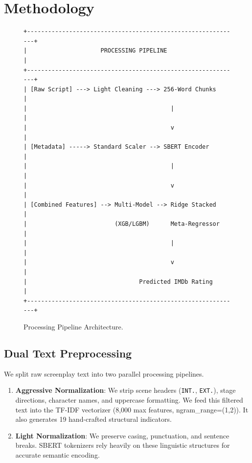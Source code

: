 \documentclass[conference]{IEEEtran}
\begin{document}
\section{Methodology}

\begin{figure}[!t]
\begin{center}
\begin{verbatim}
+-------------------------------------------------------------+
|                     PROCESSING PIPELINE                     |
+-------------------------------------------------------------+
| [Raw Script] ---> Light Cleaning ---> 256-Word Chunks       |
|                                         |                   |
|                                         v                   |
| [Metadata] -----> Standard Scaler --> SBERT Encoder         |
|                                         |                   |
|                                         v                   |
| [Combined Features] --> Multi-Model --> Ridge Stacked       |
|                         (XGB/LGBM)      Meta-Regressor      |
|                                         |                   |
|                                         v                   |
|                                Predicted IMDb Rating        |
+-------------------------------------------------------------+
\end{verbatim}
\end{center}
\caption{Processing Pipeline Architecture.}
\label{fig1}
\end{figure}

\subsection{Dual Text Preprocessing}
We split raw screenplay text into two parallel processing pipelines. 
\begin{enumerate}
\item \textbf{Aggressive Normalization}: We strip scene headers (\texttt{INT.}, \texttt{EXT.}), stage directions, character names, and uppercase formatting. We feed this filtered text into the TF-IDF vectorizer (8,000 max features, ngram\_range=(1,2)). It also generates 19 hand-crafted structural indicators.
\item \textbf{Light Normalization}: We preserve casing, punctuation, and sentence breaks. SBERT tokenizers rely heavily on these linguistic structures for accurate semantic encoding.
\end{enumerate}
\end{document}

